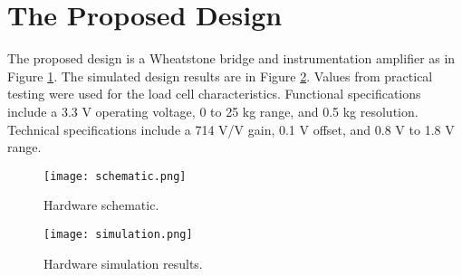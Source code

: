 \section{The Proposed Design}

The proposed design is a Wheatstone bridge and instrumentation amplifier as in Figure \ref{fig:schematic}. The simulated design results are in Figure \ref{fig:simulation}. Values from practical testing were used for the load cell characteristics. Functional specifications include a 3.3 V operating voltage, 0 to 25 kg range, and 0.5 kg resolution. Technical specifications include a 714 V/V gain, 0.1 V offset, and 0.8 V to 1.8 V range.



\begin{figure}[!ht]
	\centering
	\texttt{[image: schematic.png]}
	\caption{Hardware schematic.}
	\label{fig:schematic}
\end{figure}

\begin{figure}[!ht]
	\centering
	\texttt{[image: simulation.png]}
	\caption{Hardware simulation results.}
	\label{fig:simulation}
\end{figure}



